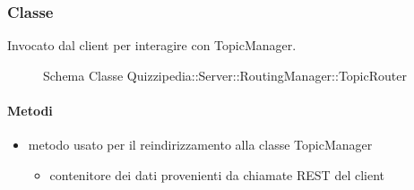 \subsubsection{Classe }
Invocato dal client per interagire con TopicManager.
\begin{figure}[H]
\centering
\noindent{}
\caption[Schema Classe TopicRouter]{Schema Classe Quizzipedia::Server::RoutingManager::TopicRouter}
\end{figure}
\paragraph{Metodi}
\begin{itemize}
\item {}
\newline
metodo usato per il reindirizzamento alla classe TopicManager
\newline
{}
\newline
\begin{itemize}
\item {}
\newline
contenitore dei dati provenienti da chiamate REST del client
\end{itemize}
\end{itemize}
